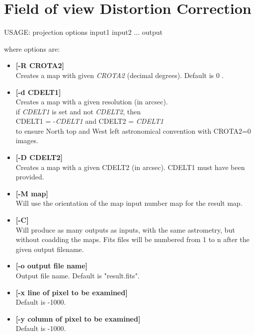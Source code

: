 \section*{Field of view Distortion Correction}
\begin{center}
 USAGE: projection  options input1 input2 ... output  
\end{center}
where options are:
\begin{itemize}
\item {\bf [-R CROTA2]} \\
Creates a map with given {\em CROTA2} (decimal degrees).
Default is 0 .
\item {\bf [-d CDELT1]} \\
Creates a map with a given resolution (in arcsec). \\
if {\em CDELT1} is set and not {\em CDELT2}, then  \\
                 CDELT1 = -{\em CDELT1} and CDELT2 = {\em CDELT1} \\
to ensure North top and West left astronomical convention  with CROTA2=0 images.
\item {\bf [-D CDELT2]} \\
 Creates a map with a given CDELT2 (in arcsec). CDELT1 must have been provided.
\item {\bf [-M map]} \\
 Will use the orientation of the map input number map for the result map.
\item {\bf [-C]} \\
Will produce as many outputs as inputs, with the same astrometry, 
but without coadding the maps. Fits files will be numbered from 1 to n 
after the given output filename.
\item {\bf [-o output file name]} \\
Output file name. Default is "result.fits". 
\item {\bf [-x line of pixel to be examined]} \\
Default is -1000.
\item {\bf [-y column of pixel to be examined]} \\
 Default is -1000.
\end{itemize}



